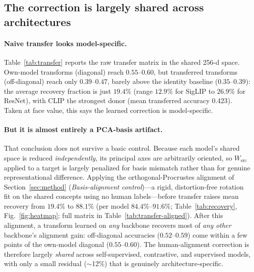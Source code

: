 \documentclass{article}
\begin{document}
\subsection{The correction is largely shared across architectures}
\paragraph{Naive transfer looks model-specific.} Table~\ref{tab:transfer} reports the
raw transfer matrix in the shared 256-d space. Own-model transforms (diagonal) reach
$0.55$--$0.60$, but transferred transforms (off-diagonal) reach only $0.39$--$0.47$,
barely above the identity baseline ($0.35$--$0.39$): the average recovery fraction is
just $19.4\%$ (range $12.9\%$ for SigLIP to $26.9\%$ for ResNet), with CLIP the
strongest donor (mean transferred accuracy $0.423$). Taken at face value, this says the
learned correction is model-specific.

\paragraph{But it is almost entirely a PCA-basis artifact.} That conclusion does not
survive a basic control. Because each model's shared space is reduced
\emph{independently}, its principal axes are arbitrarily oriented, so $W_{\text{src}}$
applied to a target is largely penalized for basis mismatch rather than for genuine
representational difference. Applying the orthogonal-Procrustes alignment of
Section~\ref{sec:method} (\emph{Basis-alignment control})---a rigid, distortion-free
rotation fit on the shared concepts using no human labels---before transfer raises mean
recovery from $19.4\%$ to $\mathbf{88.1\%}$ (per model $84.4\%$--$91.6\%$;
Table~\ref{tab:recovery}, Fig.~\ref{fig:heatmap}; full matrix in
Table~\ref{tab:transfer-aligned}). After this alignment, a transform
learned on \emph{any} backbone recovers most of \emph{any other} backbone's alignment
gain: off-diagonal accuracies ($0.52$--$0.59$) come within a few points of the
own-model diagonal ($0.55$--$0.60$). The human-alignment correction is therefore
largely \emph{shared} across self-supervised, contrastive, and supervised models, with
only a small residual ($\sim$12\%) that is genuinely architecture-specific.
\end{document}

